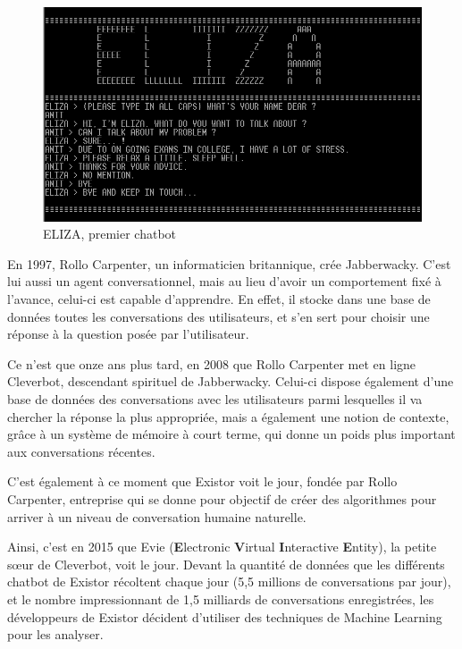 \documentclass[a4paper, 12pt]{article} %
\begin{document}
\begin{figure}[!h]%
	\begin{center} 
		\includegraphics[width=0.50\columnwidth]{images/eliza.png}%
		\caption{ELIZA, premier chatbot}%
	\end{center}
\end{figure}

En 1997, Rollo Carpenter, un informaticien britannique, crée Jabberwacky. C’est lui aussi un agent conversationnel, mais au lieu d’avoir un comportement fixé à l'avance, celui-ci est capable d’apprendre. En effet, il stocke dans une base de données toutes les conversations des utilisateurs, et s’en sert pour choisir une réponse à la question posée par l’utilisateur.

Ce n’est que onze ans plus tard, en 2008 que Rollo Carpenter met en ligne Cleverbot, descendant spirituel de Jabberwacky. Celui-ci dispose également d’une base de données des conversations avec les utilisateurs parmi lesquelles il va chercher la réponse la plus appropriée, mais a également une notion de contexte, grâce à un système de mémoire à court terme, qui donne un poids plus important aux conversations récentes.


C'est également à ce moment que Existor voit le jour, fondée par Rollo Carpenter, entreprise qui se donne pour objectif de créer des algorithmes pour arriver à un niveau de conversation humaine naturelle.

Ainsi, c’est en 2015 que Evie (\textbf{E}lectronic \textbf{V}irtual \textbf{I}nteractive \textbf{E}ntity), la petite sœur de Cleverbot, voit le jour. Devant la quantité de données que les différents chatbot de Existor récoltent chaque jour (5,5 millions de conversations par jour), et le nombre impressionnant de 1,5 milliards de conversations enregistrées, les développeurs de Existor décident d'utiliser des techniques de Machine Learning pour les analyser. 
\end{document}
